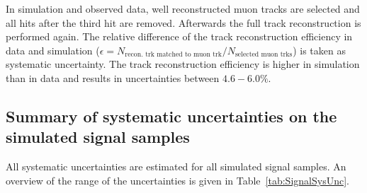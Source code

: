 In simulation and observed data, well reconstructed muon tracks are selected and all hits after the third hit are removed.
Afterwards the full track reconstruction is performed again.
The relative difference of the track reconstruction efficiency in data and simulation ($\epsilon = N_{\text{recon. trk matched to muon trk}}/N_{\text{selected muon trks}}$) is taken as systematic uncertainty.
The track reconstruction efficiency is higher in simulation than in data and results in uncertainties between $4.6-6.0\%$.\\


\subsection*{Summary of systematic uncertainties on the simulated signal samples}
All systematic uncertainties are estimated for all simulated signal samples.
An overview of the range of the uncertainties is given in Table~\ref{tab:SignalSysUnc}.


